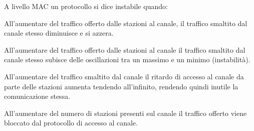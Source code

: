 \question[1]
A livello MAC un protocollo si dice instabile quando:

\begin{checkboxes}
	\CorrectChoice All'aumentare del traffico offerto dalle stazioni al canale, il traffico smaltito dal canale stesso diminuisce e si azzera.

	\choice All'aumentare del traffico offerto dalle stazioni al canale il traffico smaltito dal canale stesso subisce delle oscillazioni tra un massimo e un minimo (instabilità).

	\choice All'aumentare del traffico smaltito dal canale il ritardo di accesso al canale da parte delle stazioni aumenta tendendo all'infinito, rendendo quindi inutile la comunicazione stessa.

	\choice All'aumentare del numero di stazioni presenti sul canale il traffico offerto viene bloccato dal protocollo di accesso al canale.
\end{checkboxes}
